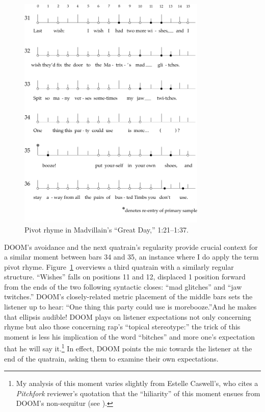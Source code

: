     \begin{figure}[!t]
        \centering
        \includegraphics[width=0.8\textwidth]{images/figures/chp 03/121137greatdayachievedpivot.pdf}
        \caption{Pivot rhyme in Madvillain's ``Great Day,'' 1:21--1:37.}
        \label{fig:doomachievedpiv}
    \end{figure}

DOOM's avoidance and the next quatrain's regularity provide crucial context for a similar moment between 
bars 34 and 35, an instance where I do apply the term pivot rhyme. Figure~\ref{fig:doomachievedpiv} overviews
a third quatrain with a similarly regular structure. ``Wishes''  falls on positions 11 and 12, displaced 1 
position forward from the ends of the two following  syntactic  closes: ``mad glitches'' and
``jaw twitches.'' DOOM's closely-related metric placement of the middle bars sets the listener up to hear:
``One thing this party could use is more\textellipsis booze.''And he makes that ellipsis audible! DOOM plays
on listener expectations not only concerning rhyme but also those concerning rap's ``topical stereotype:'' 
the trick of this moment is less his implication of the word ``bitches'' and more one's expectation that
he will say it.\footnote{
    My analysis of this moment varies slightly from Estelle Caswell's, who cites a \textit{Pitchfork} 
    reviewer's quotation that the ``hiliarity'' of this moment ensues from DOOM's non-sequitur (see
    \cite{estellecaswellRappingDeconstructedBest2016}).}
In effect, DOOM points the mic towards the listener at the end of the quatrain, asking them to examine
their own expectations.

